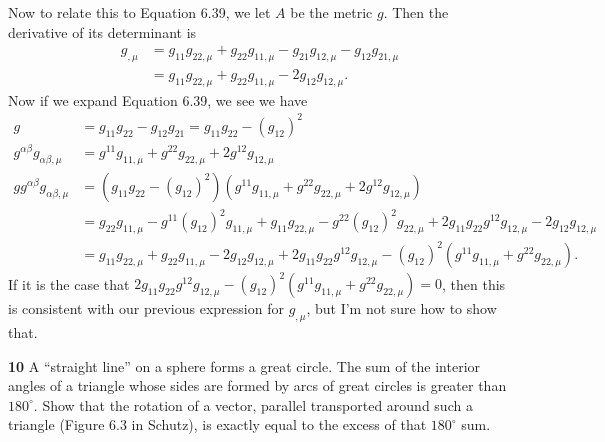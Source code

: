 \documentclass[gr-notes.tex]{subfiles}
\begin{document}
Now to relate this to Equation 6.39, we let $A$ be the metric $g$. Then the derivative of its determinant is
%
\begin{align*}
  g_{,\mu} &=
  g_{11} g_{22,\mu} + g_{22} g_{11,\mu} -
  g_{21} g_{12,\mu} - g_{12} g_{21,\mu}
  \\ &=
  g_{11} g_{22,\mu} + g_{22} g_{11,\mu} - 2 g_{12} g_{12,\mu}.
\end{align*}
%
Now if we expand Equation 6.39, we see we have
%
\begin{align*}
  g &=
  g_{11} g_{22} - g_{12} g_{21} =
  g_{11} g_{22} - (g_{12})^2
  \\
  g^{\alpha\beta} g_{\alpha\beta,\mu} &=
  g^{11} g_{11,\mu} + g^{22} g_{22,\mu} + 2 g^{12} g_{12,\mu}
  \\
  g g^{\alpha\beta} g_{\alpha\beta,\mu} &=
  (g_{11} g_{22} - (g_{12})^2)
  (g^{11} g_{11,\mu} + g^{22} g_{22,\mu} + 2 g^{12} g_{12,\mu})
  \\ &=
  g_{22} g_{11,\mu} - g^{11} (g_{12})^2 g_{11,\mu} +
  g_{11} g_{22,\mu} - g^{22} (g_{12})^2 g_{22,\mu} +
  2 g_{11} g_{22} g^{12} g_{12,\mu} -
  2 g_{12} g_{12,\mu}
  \\ &=
  g_{11} g_{22,\mu} + g_{22} g_{11,\mu} - 2 g_{12} g_{12,\mu}
  + 2 g_{11} g_{22} g^{12} g_{12,\mu}
  - (g_{12})^2 (g^{11} g_{11,\mu} + g^{22} g_{22,\mu}).
\end{align*}
%
If it is the case that $2 g_{11} g_{22} g^{12} g_{12,\mu} - (g_{12})^2 (g^{11} g_{11,\mu} + g^{22} g_{22,\mu}) = 0$, then this is consistent with our previous expression for $g_{,\mu}$, but I'm not sure how to show that.


\textbf{10}
A ``straight line'' on a sphere forms a great circle. The sum of the interior angles of a triangle whose sides are formed by arcs of great circles is greater than $180^\circ$. Show that the rotation of a vector, parallel transported around such a triangle (Figure 6.3 in Schutz), is exactly equal to the excess of that $180^\circ$ sum.
\end{document}
